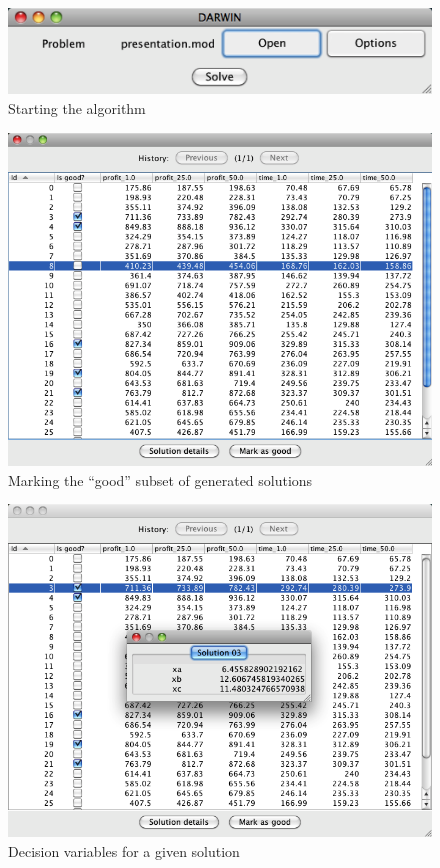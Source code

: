 \begin{figure}
  \centering
  \includegraphics[scale=0.7]{img/manual/03_problem_selected}
  \caption{Starting the algorithm}
  \label{manual_03_selected}
\end{figure}

\begin{figure}
  \centering
  \includegraphics[scale=0.7]{img/manual/04_marking_solutions}
  \caption{Marking the ``good'' subset of generated solutions}
  \label{manual_04_mark_as_good}
\end{figure}

\begin{figure}
  \centering
  \includegraphics[scale=0.7]{img/manual/05_solution_details}
  \caption{Decision variables for a given solution}
  \label{manual_05_dec_var}
\end{figure}

